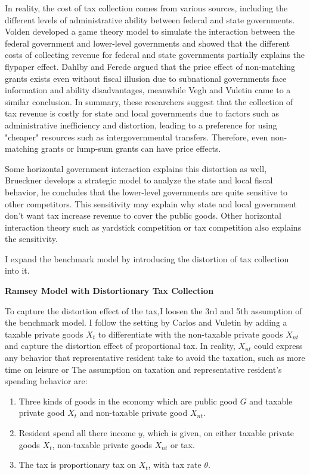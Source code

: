 In reality, the cost of tax collection comes from various sources, including the different levels of administrative ability between federal and state governments. Volden \cite{volden2007intergovernmental} developed a game theory model to simulate the interaction between the federal government and lower-level governments and showed that the different costs of collecting revenue for federal and state governments partially explains the flypaper effect. Dahlby and Ferede \cite{dahlby2016stimulative} argued that the price effect of non-matching grants exists even without fiscal illusion due to subnational governments face information and ability disadvantages, meanwhile Vegh and Vuletin \cite{vegh2016unsticking} came to a similar conclusion. In summary, these researchers suggest that the collection of tax revenue is costly for state and local governments due to factors such as administrative inefficiency and distortion, leading to a preference for using "cheaper" resources such as intergovernmental transfers. Therefore, even non-matching grants or lump-sum grants can have price effects.

Some horizontal government interaction explains this distortion as well, Brueckner \cite{brueckner2003strategic} develops a strategic model to analyze the state and local fiscal behavior, he concludes that the lower-level governments are quite sensitive to other competitors. This sensitivity may explain why state and local government don’t want tax increase revenue to cover the public goods. Other horizontal interaction theory such as yardstick competition or tax competition also explains the sensitivity.

I expand the benchmark model by introducing the distortion of tax collection into it.

\textbf{Ramsey Model with Distortionary Tax Collection}

To capture the distortion effect of the tax,I loosen the 3rd and 5th assumption of the benchmark model. I follow the setting by Carlos and Vuletin \cite{vegh2016unsticking} by adding a taxable private goods $X_t$ to differentiate with the non-taxable private goods $X_{nt}$ and capture the distortion effect of proportional tax. In reality, $X_{nt}$ could express any behavior that representative resident take to avoid the taxation, such as more time on leisure or
The assumption on taxation and representative resident's spending behavior are:
\begin{enumerate}
    \item Three kinds of goods in the economy which are public good $G$ and taxable private good $X_t$ and non-taxable private good $X_{nt}$.\label{Xt}
    \item Resident spend all there income $y$, which is given, on either taxable private goods $X_t$, non-taxable private goods $X_{nt}$ or tax.
    \item The tax is proportionary tax on $X_{t}$, with tax rate $\theta$.
\end{enumerate}

